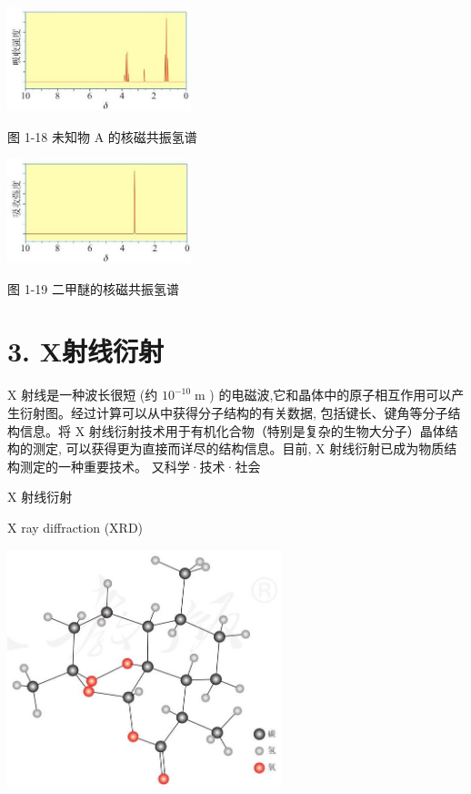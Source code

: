 \documentclass[10pt]{article}
\begin{document}
\begin{center}
\includegraphics[max width=0.4\textwidth]{images/0190efc5-b58a-7c43-bfb0-e0a030df9cfd_25_561896.jpg}
\end{center}

图 1-18 未知物 \(\mathrm{A}\) 的核磁共振氢谱

\begin{center}
\includegraphics[max width=0.4\textwidth]{images/0190efc5-b58a-7c43-bfb0-e0a030df9cfd_25_589122.jpg}
\end{center}

图 1-19 二甲醚的核磁共振氢谱

\section*{3. X射线衍射}

\(\mathrm{X}\) 射线是一种波长很短 (约 \({10}^{-{10}}\mathrm{\;m}\) ) 的电磁波,它和晶体中的原子相互作用可以产生衍射图。经过计算可以从中获得分子结构的有关数据, 包括键长、键角等分子结构信息。将 \(\mathrm{X}\) 射线衍射技术用于有机化合物（特别是复杂的生物大分子）晶体结构的测定, 可以获得更为直接而详尽的结构信息。目前, \(\mathrm{X}\) 射线衍射已成为物质结构测定的一种重要技术。 又科学·技术·社会

\begin{mdframed}

\(\mathrm{X}\) 射线衍射

\(\mathrm{X}\) ray diffraction (XRD)

\end{mdframed}

\begin{center}
\includegraphics[max width=0.6\textwidth]{images/0190efc5-b58a-7c43-bfb0-e0a030df9cfd_25_715840.jpg}
\end{center}
\end{document}
